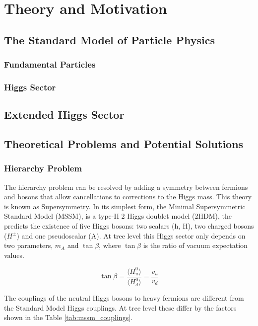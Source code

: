 \chapter{Theory and Motivation}


\section{The Standard Model of Particle Physics}

\subsection{Fundamental Particles}

\subsection{Higgs Sector}

\section{Extended Higgs Sector}

\section{Theoretical Problems and Potential Solutions}

\subsection{Hierarchy Problem}

The hierarchy problem can be resolved by adding a symmetry between fermions and bosons that allow cancellations to corrections to the Higgs mass. This theory is known as Supersymmetry. \cite{SUSY_Primer} In its simplest form, the Minimal Supersymmetric Standard Model (MSSM), is a type-II 2 Higgs doublet model (2HDM), the predicts the existence of five Higgs bosons: two scalars (h, H), two charged bosons (\(H^{\pm}\)) and one pseudoscalar (A). At tree level this Higgs sector only depends on two parameters, $m_A$ and $\tan\beta$, where $\tan\beta$ is the ratio of vacuum expectation values.

\begin{equation}
\tan \beta = \frac{\langle H_{u}^{0} \rangle}{\langle H_{d}^{0} \rangle} = \frac{v_{u}}{v_{d}}
\end{equation}

The couplings of the neutral Higgs bosons to heavy fermions are different from the Standard Model Higgs couplings. At tree level these differ by the factors shown in the Table \ref{tab:mssm_couplings}.

